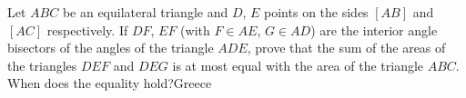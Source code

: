 Let $ABC$ be an equilateral triangle and $D$, $E$ points on the sides $[AB]$ and $[AC]$ respectively. If $DF$, $EF$ (with $F\in AE$, $G\in AD$) are the interior angle bisectors of the angles of the triangle $ADE$, prove that the sum of the areas of the triangles $DEF$ and $DEG$ is at most equal with the area of the triangle $ABC$. When does the equality hold?Greece